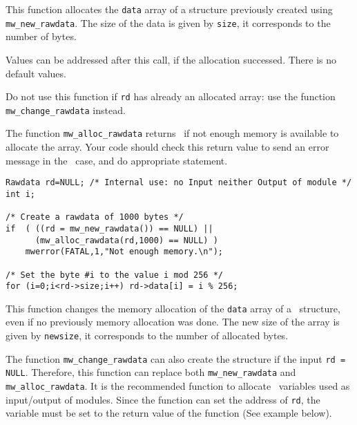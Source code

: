 \Description
This function allocates the \verb+data+ array of a \rawdata structure previously created using \verb+mw_new_rawdata+. The size of the data is given by 
\verb+size+, it corresponds to the number of bytes.

Values can be addressed after this call, if the allocation successed. There is
no default values.

Do not use this function if \verb+rd+ has already an allocated array: use
the function \verb+mw_change_rawdata+ instead.

The function \verb+mw_alloc_rawdata+ returns \Null\ if not enough memory is available to allocate the array. Your code should check this return value to 
send an error message in the \Null\ case, and do appropriate statement.

\Next
\Example
\begin{verbatim}
Rawdata rd=NULL; /* Internal use: no Input neither Output of module */
int i;

/* Create a rawdata of 1000 bytes */
if  ( ((rd = mw_new_rawdata()) == NULL) ||
      (mw_alloc_rawdata(rd,1000) == NULL) )
    mwerror(FATAL,1,"Not enough memory.\n");

/* Set the byte #i to the value i mod 256 */
for (i=0;i<rd->size;i++) rd->data[i] = i % 256;
\end{verbatim}

\newpage %

\Description
This function changes the memory allocation of the \verb+data+ array of a \rawdata\ structure, even if no previously memory allocation was done.
The new size of the array is given by \verb+newsize+, it corresponds to the number 
of allocated bytes.

The function \verb+mw_change_rawdata+ can also create the structure if the input \verb+rd = NULL+.
Therefore, this function can replace both \verb+mw_new_rawdata+ and
\verb+mw_alloc_rawdata+. It is the recommended function to allocate \rawdata\ variables
used as input/output of modules. Since the function can set the 
address of \verb+rd+, the variable must be set to the return value of 
the function (See example below).

